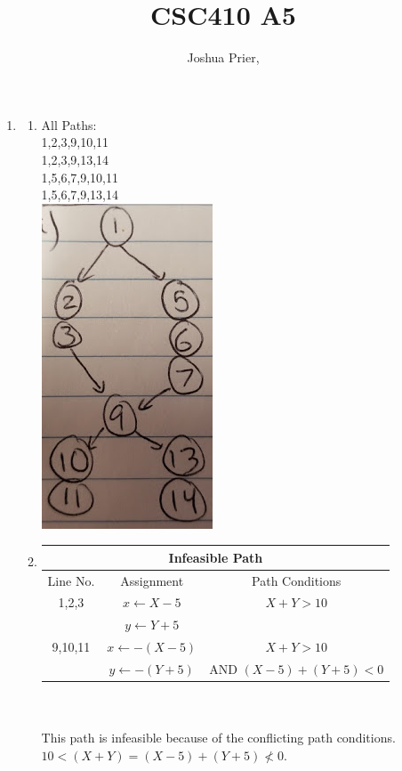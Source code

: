 \documentclass[a4paper,12pt]{article}
\title{CSC410 A5}
\author{Joshua Prier, }
\begin{document}
	\maketitle
	
	\begin{enumerate}
		\item 
			\begin{enumerate}
				\item All Paths:\\
				1,2,3,9,10,11\\
				1,2,3,9,13,14\\
				1,5,6,7,9,10,11\\
				1,5,6,7,9,13,14\\
				\includegraphics[scale=.5]{q1graph.jpg}
				\item 
					\begin{tabular}{|c|c|c|}
						\hline
						\multicolumn{3}{|c|}{Infeasible Path} \\
						\hline
						Line No. & Assignment & Path Conditions \\
						\hline
						1,2,3   & $x\leftarrow X-5$ & $X+Y > 10$ \\
						  ~ & $y\leftarrow Y+5$ & ~   \\
						\hline
						9,10,11  & $x\leftarrow -(X-5)$ & $X+Y > 10$ \\
						~ & $y\leftarrow -(Y+5)$ & AND $ (X-5) + (Y+5) < 0$   \\
						\hline
					\end{tabular} ~\\\\
				This path is infeasible because of the conflicting path conditions. $10 < (X+Y) = (X-5) + (Y+5) \nless 0$.

\end{enumerate}
\end{enumerate}
\end{document}
